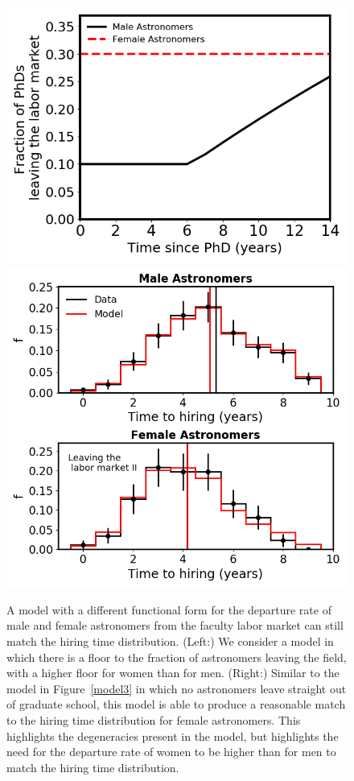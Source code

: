 \documentclass[modern]{aastex62}
\begin{document}
\begin{figure}[!hbt]
\center
\includegraphics[scale=.4]{df_model3e.png}
\includegraphics[scale=.45]{model3e.png}
\caption{A model with a different functional form for the departure rate of male and female astronomers from the faculty labor market can still match the hiring time distribution. (Left:) We consider a model in which there is a floor to the fraction of astronomers leaving the field, with a higher floor for women than for men. (Right:) Similar to the model in Figure~\ref{model3} in which no astronomers leave straight out of graduate school, this model is able to produce a reasonable match to the hiring time distribution for female astronomers. This highlights the degeneracies present in the model, but highlights the need for the departure rate of women to be higher than for men to match the hiring time distribution.\label{model3e}}
\end{figure}
\end{document}
